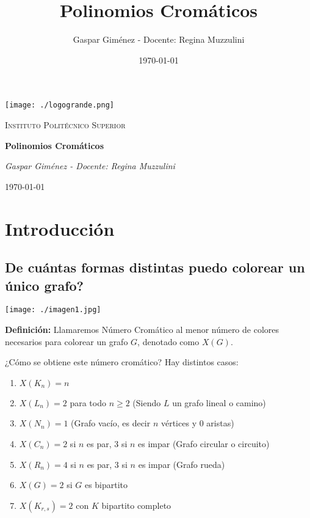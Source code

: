 \documentclass[a4paper]{article}
\title{Polinomios Cromáticos}
\author{Gaspar Giménez - Docente: Regina Muzzulini}
\date{\today}
\newcommand{\highlight}[1]{\begin{tcolorbox}[colback=gray!10,colframe=gray!30]#1\end{tcolorbox}}
\begin{document}
\begin{titlepage}
    \centering
    \texttt{[image: ./logogrande.png]}\par\vspace{1cm}
    {\scshape\LARGE Instituto Politécnico Superior \par}
    \vspace{1cm}
    {\huge\bfseries Polinomios Cromáticos\par}
    \vspace{2cm}
    {\Large\itshape Gaspar Giménez - Docente: Regina Muzzulini\par}
    \vfill
    {\large \today\par}
\end{titlepage}

\maketitle

\tableofcontents

\pagestyle{fancy}

\section{Introducción}

\subsection{De cuántas formas distintas puedo colorear un único grafo?}

\texttt{[image: ./imagen1.jpg]}

\textbf{Definición:} Llamaremos Número Cromático al menor número de colores necesarios para colorear un grafo $G$, denotado como $X(G)$.


\highlight{
¿Cómo se obtiene este número cromático?
Hay distintos casos:

\begin{enumerate}
    \item $X(K_n) = n$
    \item $X(L_n) = 2$ para todo $n \geq 2$ (Siendo $L$ un grafo lineal o camino)
    \item $X(N_n) = 1$ (Grafo vacío, es decir $n$ vértices y $0$ aristas)
    \item $X(C_n) = 2$ si $n$ es par, $3$ si $n$ es impar (Grafo circular o circuito)
    \item $X(R_n) = 4$ si $n$ es par, $3$ si $n$ es impar (Grafo rueda)
    \item $X(G) = 2$ si $G$ es bipartito
    \item $X(K_{r,s}) = 2$ con $K$ bipartito completo
\end{enumerate}
}
\end{document}
